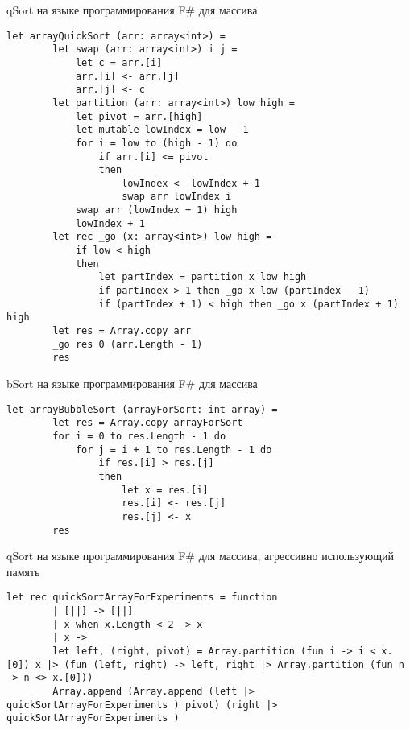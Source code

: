 \begin{algorithm}[H]
\caption{qSort на языке программирования F\# для массива}
\label{lst:qSortArray}
\begin{verbatim}
let arrayQuickSort (arr: array<int>) =
        let swap (arr: array<int>) i j =
            let c = arr.[i]
            arr.[i] <- arr.[j]
            arr.[j] <- c
        let partition (arr: array<int>) low high =
            let pivot = arr.[high]
            let mutable lowIndex = low - 1
            for i = low to (high - 1) do
                if arr.[i] <= pivot
                then
                    lowIndex <- lowIndex + 1
                    swap arr lowIndex i
            swap arr (lowIndex + 1) high
            lowIndex + 1
        let rec _go (x: array<int>) low high =
            if low < high
            then
                let partIndex = partition x low high
                if partIndex > 1 then _go x low (partIndex - 1)
                if (partIndex + 1) < high then _go x (partIndex + 1) high
        let res = Array.copy arr
        _go res 0 (arr.Length - 1)
        res
\end{verbatim}
\end{algorithm}
\begin{algorithm}[H]
\caption{bSort на языке программирования F\# для массива}
\label{lst:bSortArray}
\begin{verbatim}
let arrayBubbleSort (arrayForSort: int array) =
        let res = Array.copy arrayForSort
        for i = 0 to res.Length - 1 do
            for j = i + 1 to res.Length - 1 do
                if res.[i] > res.[j]
                then
                    let x = res.[i]
                    res.[i] <- res.[j]
                    res.[j] <- x
        res
\end{verbatim}
\end{algorithm}
\begin{algorithm}[H]
\caption{qSort на языке программирования F\# для массива, агрессивно использующий память}
\label{lst:qSortArrayExp}
\begin{verbatim}
let rec quickSortArrayForExperiments = function
        | [||] -> [||]
        | x when x.Length < 2 -> x
        | x ->
        let left, (right, pivot) = Array.partition (fun i -> i < x.[0]) x |> (fun (left, right) -> left, right |> Array.partition (fun n -> n <> x.[0]))
        Array.append (Array.append (left |> quickSortArrayForExperiments ) pivot) (right |> quickSortArrayForExperiments )
\end{verbatim}
\end{algorithm}

